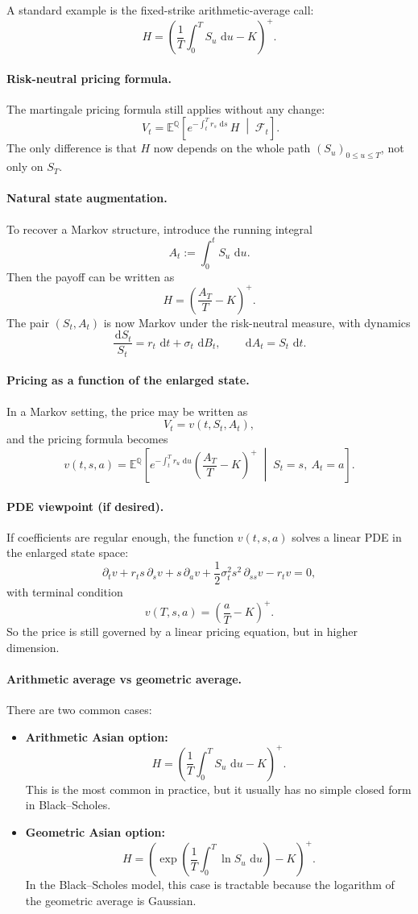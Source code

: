 \documentclass[11pt]{article}
\newcommand{\Qbb}{\mathbb{Q}}
\newcommand{\E}{\mathbb{E}}
\newcommand{\dd}{\,\mathrm{d}}
\newcommand{\1}{\mathbf{1}}
\begin{document}
A standard example is the fixed-strike arithmetic-average call:
\[
H=\left(\frac{1}{T}\int_0^T S_u\,\dd u - K\right)^+.
\]

\paragraph{Risk-neutral pricing formula.}
The martingale pricing formula still applies without any change:
\[
\boxed{
\ V_t
=
\E^{\Qbb}\!\left[
e^{-\int_t^T r_s\,\dd s}\,H
\;\middle|\;
\mathcal F_t
\right].
}
\]
The only difference is that \(H\) now depends on the whole path \((S_u)_{0\le u\le T}\), not only on \(S_T\).

\paragraph{Natural state augmentation.}
To recover a Markov structure, introduce the running integral
\[
A_t:=\int_0^t S_u\,\dd u.
\]
Then the payoff can be written as
\[
H=\left(\frac{A_T}{T}-K\right)^+.
\]
The pair \((S_t,A_t)\) is now Markov under the risk-neutral measure, with dynamics
\[
\frac{\dd S_t}{S_t}=r_t\,\dd t+\sigma_t\,\dd B_t,
\qquad
\dd A_t=S_t\,\dd t.
\]

\paragraph{Pricing as a function of the enlarged state.}
In a Markov setting, the price may be written as
\[
V_t=v(t,S_t,A_t),
\]
and the pricing formula becomes
\[
v(t,s,a)
=
\E^{\Qbb}\!\left[
e^{-\int_t^T r_u\,\dd u}
\left(\frac{A_T}{T}-K\right)^+
\;\middle|\;
S_t=s,\ A_t=a
\right].
\]

\paragraph{PDE viewpoint (if desired).}
If coefficients are regular enough, the function \(v(t,s,a)\) solves a linear PDE in the enlarged state space:
\[
\partial_t v
+ r_t s\,\partial_s v
+ s\,\partial_a v
+ \frac12 \sigma_t^2 s^2\,\partial_{ss}v
- r_t v
=0,
\]
with terminal condition
\[
v(T,s,a)=\left(\frac{a}{T}-K\right)^+.
\]
So the price is still governed by a linear pricing equation, but in higher dimension.

\paragraph{Arithmetic average vs geometric average.}
There are two common cases:
\begin{itemize}[leftmargin=1.4em]
    \item \textbf{Arithmetic Asian option:}
    \[
    H=\left(\frac{1}{T}\int_0^T S_u\,\dd u-K\right)^+.
    \]
    This is the most common in practice, but it usually has no simple closed form in Black--Scholes.
    \item \textbf{Geometric Asian option:}
    \[
    H=\left(\exp\!\left(\frac{1}{T}\int_0^T \ln S_u\,\dd u\right)-K\right)^+.
    \]
    In the Black--Scholes model, this case is tractable because the logarithm of the geometric average is Gaussian.
\end{itemize}
\end{document}
